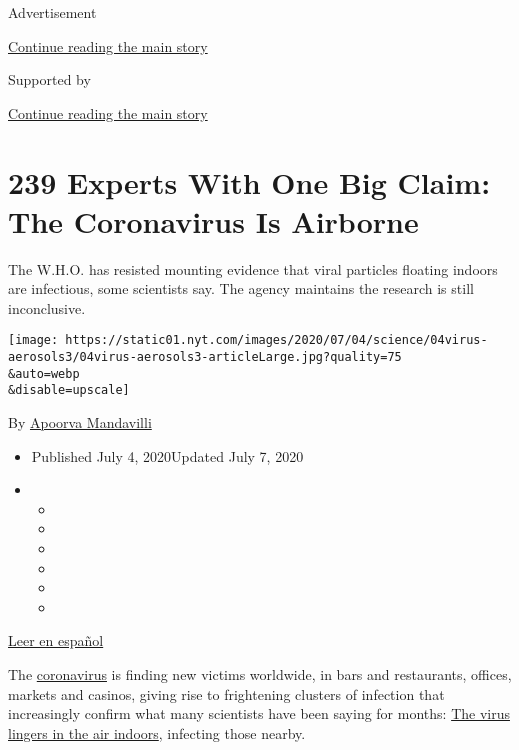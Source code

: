 Advertisement

\protect\hyperlink{after-top}{Continue reading the main story}

Supported by

\protect\hyperlink{after-sponsor}{Continue reading the main story}

\hypertarget{239-experts-with-one-big-claim-the-coronavirus-is-airborne}{%
\section{239 Experts With One Big Claim: The Coronavirus Is
Airborne}\label{239-experts-with-one-big-claim-the-coronavirus-is-airborne}}

The W.H.O. has resisted mounting evidence that viral particles floating
indoors are infectious, some scientists say. The agency maintains the
research is still inconclusive.

\texttt{[image: https://static01.nyt.com/images/2020/07/04/science/04virus-aerosols3/04virus-aerosols3-articleLarge.jpg?quality=75\\\&auto=webp\\\&disable=upscale]}

By \href{https://www.nytimes.com/by/apoorva-mandavilli}{Apoorva
Mandavilli}

\begin{itemize}
\item
  Published July 4, 2020Updated July 7, 2020
\item
  \begin{itemize}
  \item
  \item
  \item
  \item
  \item
  \item
  \end{itemize}
\end{itemize}

\href{https://www.nytimes.com/es/2020/07/06/espanol/ciencia-y-tecnologia/coronavirus-transmision-aire.html}{Leer
en español}

The
\href{https://www.nytimes.com/2020/07/04/health/coronavirus-neanderthals.html}{coronavirus}
is finding new victims worldwide, in bars and restaurants, offices,
markets and casinos, giving rise to frightening clusters of infection
that increasingly confirm what many scientists have been saying for
months:
\href{https://www.nytimes.com/2020/07/09/health/virus-aerosols-who.html}{The
virus lingers in the air indoors}, infecting those nearby.

